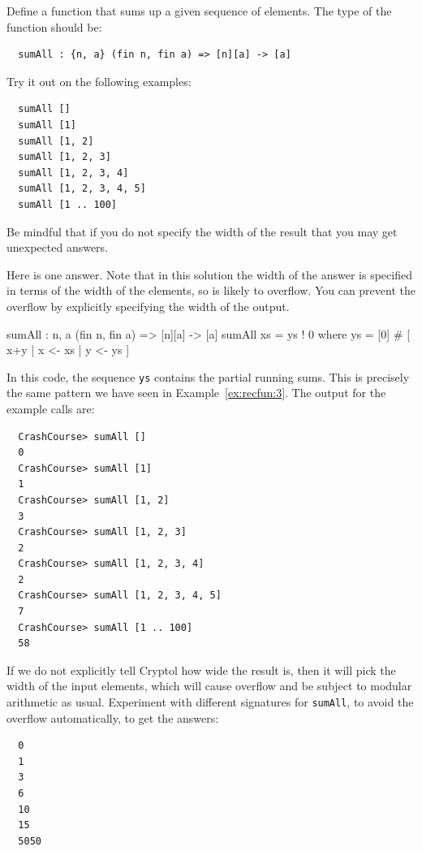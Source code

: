 \begin{Exercise}\label{ex:recfun:4}
  Define a function that sums up a given sequence of elements. The
  type of the function should be:
\begin{Verbatim}
  sumAll : {n, a} (fin n, fin a) => [n][a] -> [a]
\end{Verbatim}
Try it out on the following examples:
\begin{Verbatim}
  sumAll []
  sumAll [1]
  sumAll [1, 2]
  sumAll [1, 2, 3]
  sumAll [1, 2, 3, 4]
  sumAll [1, 2, 3, 4, 5]
  sumAll [1 .. 100]
\end{Verbatim}
Be mindful that if you do not specify the width of the result that you
may get unexpected answers.

\end{Exercise}
\begin{Answer}
  Here is one answer.  Note that in this solution the width of the
  answer is specified in terms of the width of the elements, so is
  likely to overflow. You can prevent the overflow by explicitly
  specifying the width of the output.
\begin{code}
  sumAll : {n, a} (fin n, fin a) => [n][a] -> [a]
  sumAll xs = ys ! 0
    where ys = [0] # [ x+y | x <- xs
                           | y <- ys
                     ]
\end{code}
In this code, the sequence {\tt ys} contains the partial running sums.
This is precisely the same pattern we have seen in
Example~\ref{ex:recfun:3}.  The output for the example calls are:
\begin{Verbatim}
  CrashCourse> sumAll []
  0
  CrashCourse> sumAll [1]
  1
  CrashCourse> sumAll [1, 2]
  3
  CrashCourse> sumAll [1, 2, 3]
  2
  CrashCourse> sumAll [1, 2, 3, 4]
  2
  CrashCourse> sumAll [1, 2, 3, 4, 5]
  7
  CrashCourse> sumAll [1 .. 100]
  58
\end{Verbatim}
If we do not explicitly tell Cryptol how wide the result is, then it
will pick the width of the input elements, which will cause overflow
and be subject to modular arithmetic as usual. Experiment with
different signatures for {\tt sumAll}, to avoid the overflow
automatically, to get the answers:
\begin{Verbatim}
  0
  1
  3
  6
  10
  15
  5050
\end{Verbatim}
\indModular\indOverflow \end{Answer}

